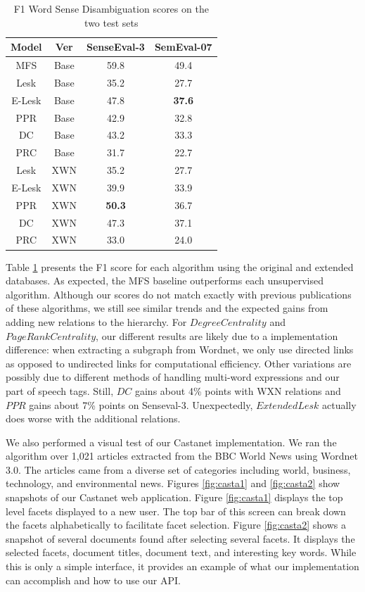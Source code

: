 \documentclass[a4paper,11pt]{article}
\begin{document}
\begin{table}[h]
\small
\center
\begin{tabular}{|c|c|c|c|}
\hline
Model & Ver & SenseEval-3 & SemEval-07 \\
\hline
MFS & Base & 59.8 & 49.4 \\
\hline
Lesk & Base & 35.2 & 27.7 \\
E-Lesk & Base & 47.8 & \bf{37.6} \\
PPR & Base & 42.9 & 32.8  \\
DC & Base & 43.2 & 33.3 \\
PRC & Base & 31.7 & 22.7 \\
\hline
Lesk & XWN & 35.2 & 27.7 \\
E-Lesk & XWN & 39.9 & 33.9 \\
PPR & XWN & \bf{50.3} & 36.7  \\
DC & XWN & 47.3 & 37.1 \\
PRC & XWN & 33.0 & 24.0 \\
\hline
\end{tabular}
\caption{F1 Word Sense Disambiguation scores on the two test sets}
\label{tab:wsd}
\end{table}

Table \ref{tab:wsd} presents the F1 score for each algorithm using the original and extended databases.  As expected, the MFS baseline outperforms each unsupervised algorithm.  Although our scores do not match exactly with previous publications of these algorithms, we still see similar trends and the expected gains from adding new relations to the hierarchy.  For $DegreeCentrality$ and $PageRankCentrality$, our different results are likely due to a implementation difference: when extracting a subgraph from Wordnet, we only use directed links as opposed to undirected links for computational efficiency.  Other variations are possibly due to different methods of handling multi-word expressions and our part of speech tags.  Still, $DC$ gains about 4\% points with WXN relations and $PPR$ gains about 7\% points on Senseval-3.  Unexpectedly, $ExtendedLesk$ actually does worse with the additional relations.  

We also performed a visual test of our Castanet implementation.  We ran the algorithm over 1,021 articles extracted from the BBC World News using Wordnet 3.0. The articles came from a diverse set of categories including world, business, technology, and environmental news. Figures \ref{fig:casta1} and \ref{fig:casta2} show snapshots of our Castanet web application. Figure \ref{fig:casta1} displays the top level facets displayed to a new user.  The top bar of this screen can break down the facets alphabetically to facilitate facet selection.  Figure \ref{fig:casta2} shows a snapshot of several documents found after selecting several facets.  It displays the selected facets, document titles, document text, and interesting key words.                  While this is only a simple interface, it provides an example of what our implementation can accomplish and how to use our API.
\end{document}
